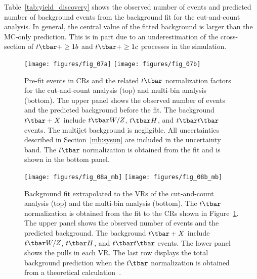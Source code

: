 Table~\ref{tab:yield_discovery} shows the observed number of events and
predicted number of background events from the background fit for the
cut-and-count analysis. In general, the central value of the fitted background
is larger than the MC-only prediction. This is in part due to an
underestimation of the cross-section of $t\tbar+ \geq 1b$ and $t\tbar+ \geq 1c$
processes in the simulation.

\begin{figure}[H]
	\texttt{[image: figures/fig\_07a]}
	\texttt{[image: figures/fig\_07b]}
	\centering

	\caption{Pre-fit events in CRs and the related $t\tbar$ normalization factors
		for the cut-and-count analysis (top) and multi-bin analysis (bottom). The
		upper panel shows the observed number of events and the predicted background
		before the fit. The background $t\tbar+X$ include $t\tbar W/Z$, $t\tbar H$,
		and $t\tbar t\tbar$ events. The multijet background is negligible. All
		uncertainties described in Section~\ref{mb:sysun} are included in the
		uncertainty band. The $t\tbar$ normalization is obtained from the fit and is
		shown in the bottom panel.}

	\label{f:fig_07ab}
\end{figure}



\begin{figure}[H]
	\texttt{[image: figures/fig\_08a\_mb]}
	\texttt{[image: figures/fig\_08b\_mb]}
	\centering

	\caption{Background fit extrapolated to the VRs of the cut-and-count analysis
		(top) and the multi-bin analysis (bottom). The $t\tbar$ normalization is
		obtained from the fit to the CRs shown in Figure~\ref{f:fig_07ab}. The upper
		panel shows the observed number of events and the predicted background. The
		background $t\tbar+X$ include $t\tbar W/Z$, $t\tbar H$, and $t\tbar t\tbar$
		events. The lower panel shows the pulls in each VR. The last row displays the
		total background prediction when the $t\tbar$ normalization is obtained from a
		theoretical calculation~\cite{Czakon:2011xx}.}

	\label{f:fig_08ab}
\end{figure}

